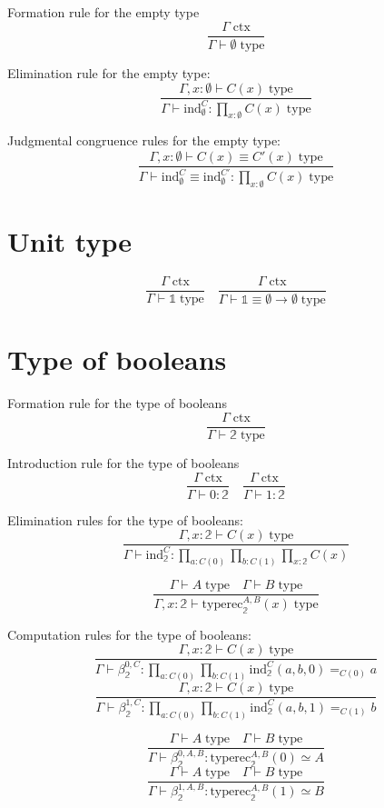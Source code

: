 \documentclass{book}
\begin{document}
Formation rule for the empty type
$$\frac{\Gamma \; \mathrm{ctx}}{\Gamma \vdash \emptyset \; \mathrm{type}}$$

Elimination rule for the empty type:
$$\frac{\Gamma, x:\emptyset \vdash C(x) \; \mathrm{type}}{\Gamma \vdash \mathrm{ind}_\emptyset^C:\prod_{x:\emptyset} C(x) \; \mathrm{type}}$$

Judgmental congruence rules for the empty type:
$$\frac{\Gamma, x:\emptyset \vdash C(x) \equiv C'(x) \; \mathrm{type}}{\Gamma \vdash \mathrm{ind}_\emptyset^C \equiv \mathrm{ind}_\emptyset^{C'}:\prod_{x:\emptyset} C(x) \; \mathrm{type}}$$

\section{Unit type}

$$\frac{\Gamma \; \mathrm{ctx}}{\Gamma \vdash \mathbb{1} \; \mathrm{type}} \quad \frac{\Gamma \; \mathrm{ctx}}{\Gamma \vdash \mathbb{1} \equiv \emptyset \to \emptyset \; \mathrm{type}}$$

\section{Type of booleans}

Formation rule for the type of booleans
$$\frac{\Gamma \; \mathrm{ctx}}{\Gamma \vdash \mathbb{2} \; \mathrm{type}}$$

Introduction rule for the type of booleans
$$\frac{\Gamma \; \mathrm{ctx}}{\Gamma \vdash 0:\mathbb{2}} \quad \frac{\Gamma \; \mathrm{ctx}}{\Gamma \vdash 1:\mathbb{2}}$$

Elimination rules for the type of booleans:
$$\frac{\Gamma, x:\mathbb{2} \vdash C(x) \; \mathrm{type}}{\Gamma \vdash \mathrm{ind}_\mathbb{2}^C:\prod_{a:C(0)} \prod_{b:C(1)} \prod_{x:\mathbb{2}} C(x)}$$

$$\frac{\Gamma \vdash A \; \mathrm{type} \quad \Gamma \vdash B \; \mathrm{type}}{\Gamma, x:\mathbb{2} \vdash \mathrm{typerec}_\mathbb{2}^{A, B}(x) \; \mathrm{type}}$$

Computation rules for the type of booleans:
$$\frac{\Gamma, x:\mathbb{2} \vdash C(x) \; \mathrm{type}}{\Gamma \vdash \beta_\mathbb{2}^{0, C}:\prod_{a:C(0)} \prod_{b:C(1)} \mathrm{ind}_\mathbb{2}^C(a, b, 0) =_{C(0)} a}$$
$$\frac{\Gamma, x:\mathbb{2} \vdash C(x) \; \mathrm{type}}{\Gamma \vdash \beta_\mathbb{2}^{1, C}:\prod_{a:C(0)} \prod_{b:C(1)} \mathrm{ind}_\mathbb{2}^C(a, b, 1) =_{C(1)} b}$$

$$\frac{\Gamma \vdash A \; \mathrm{type} \quad \Gamma \vdash B \; \mathrm{type}}{\Gamma \vdash \beta_\mathbb{2}^{0, A, B}:\mathrm{typerec}_\mathbb{2}^{A, B}(0) \simeq A}$$
$$\frac{\Gamma \vdash A \; \mathrm{type} \quad \Gamma \vdash B \; \mathrm{type}}{\Gamma \vdash \beta_\mathbb{2}^{1, A, B}:\mathrm{typerec}_\mathbb{2}^{A, B}(1) \simeq B}$$
\end{document}
